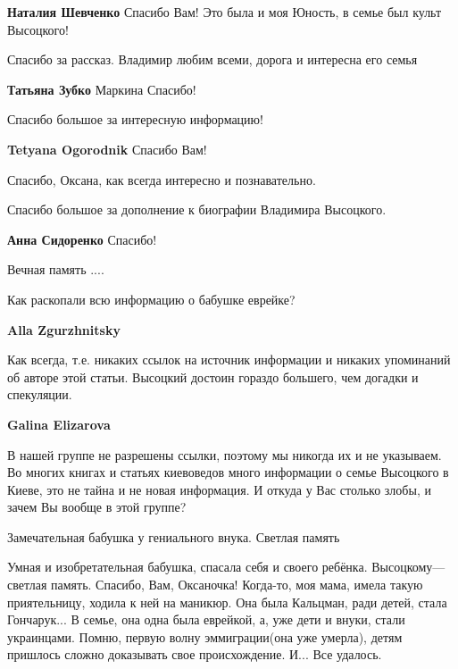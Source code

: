 \begin{itemize}
\textbf{Наталия Шевченко} Спасибо Вам! Это была и моя Юность, в семье был культ Высоцкого!

Спасибо за рассказ. Владимир любим всеми, дорога и интересна его семья

\textbf{Татьяна Зубко} Маркина Спасибо!

Спасибо большое за интересную информацию!

\textbf{Tetyana Ogorodnik} Спасибо Вам!

Спасибо, Оксана, как всегда интересно и познавательно.

Спасибо большое за дополнение к биографии Владимира Высоцкого.

\textbf{Анна Сидоренко} Спасибо!

Вечная память ....

Как раскопали всю информацию о бабушке еврейке?

\begin{itemize} %
\textbf{Alla Zgurzhnitsky} 

Как всегда, т.е. никаких ссылок на источник информации и никаких упоминаний об
авторе этой статьи. Высоцкий достоин гораздо большего, чем догадки и
спекуляции.


\textbf{Galina Elizarova} 

В нашей группе не разрешены ссылки, поэтому мы никогда их и не указываем. Во
многих книгах и статьях киевоведов много информации о семье Высоцкого в Киеве,
это не тайна и не новая информация. И откуда у Вас столько злобы, и зачем Вы
вообще в этой группе?

\end{itemize} %

Замечательная бабушка у гениального внука. Светлая память


Умная и изобретательная бабушка, спасала себя и своего ребёнка.
Высоцкому—светлая память. Спасибо, Вам, Оксаночка! Когда-то, моя мама, имела
такую приятельницу, ходила к ней на маникюр. Она была Кальцман, ради детей,
стала Гончарук... В семье, она одна была еврейкой, а, уже дети и внуки, стали
украинцами. Помню, первую волну эммиграции(она уже умерла), детям пришлось
сложно доказывать свое происхождение. И... Все удалось.



\end{itemize}
